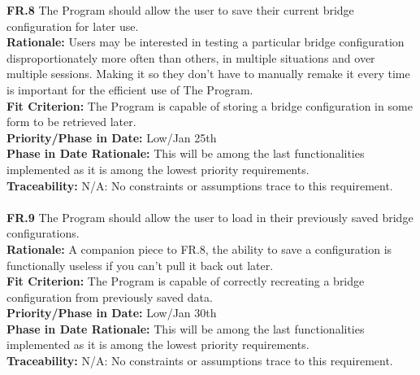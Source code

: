 \documentclass[12pt]{article}
\begin{document}
  \noindent\textbf{FR.8} The Program should allow the user to save their current bridge configuration for later use.\\
  \textbf{Rationale:} Users may be interested in testing a particular bridge configuration disproportionately more often than others, in multiple situations
   and over multiple sessions. Making it so they don't have to manually remake it every time is important for the efficient use of The Program.\\
  \textbf{Fit Criterion:} The Program is capable of storing a bridge configuration in some form to be retrieved later.\\
  \textbf{Priority/Phase in Date:} Low/Jan 25th\\
  \textbf{Phase in Date Rationale:} This will be among the last functionalities implemented as it is among the lowest priority requirements.\\
  \textbf{Traceability:} N/A: No constraints or assumptions trace to this requirement.\\\\

  \noindent\textbf{FR.9} The Program should allow the user to load in their previously saved bridge configurations.\\
  \textbf{Rationale:} A companion piece to FR.8, the ability to save a configuration is functionally useless if you can't pull it back out later.\\
  \textbf{Fit Criterion:} The Program is capable of correctly recreating a bridge configuration from previously saved data.\\
  \textbf{Priority/Phase in Date:} Low/Jan 30th\\
  \textbf{Phase in Date Rationale:} This will be among the last functionalities implemented as it is among the lowest priority requirements.\\
  \textbf{Traceability:} N/A: No constraints or assumptions trace to this requirement.\\\\
\end{document}
